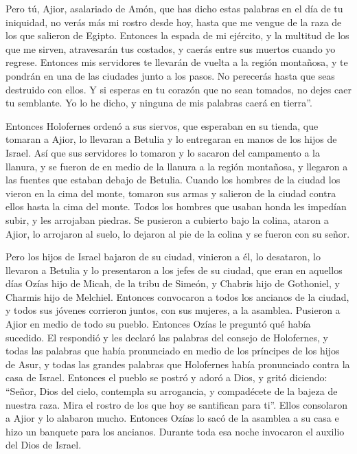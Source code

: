  Pero tú, Ajior, asalariado de Amón, que has dicho estas
palabras en el día de tu iniquidad, no verás más mi rostro desde hoy,
hasta que me vengue de la raza de los que salieron de Egipto.
 Entonces la espada de mi ejército, y la multitud de los
que me sirven, atravesarán tus costados, y caerás entre sus muertos
cuando yo regrese.  Entonces mis servidores te llevarán de
vuelta a la región montañosa, y te pondrán en una de las ciudades junto
a los pasos.  No perecerás hasta que seas destruido con
ellos.  Y si esperas en tu corazón que no sean tomados, no
dejes caer tu semblante. Yo lo he dicho, y ninguna de mis palabras caerá
en tierra''.

 Entonces Holofernes ordenó a sus siervos, que esperaban
en su tienda, que tomaran a Ajior, lo llevaran a Betulia y lo entregaran
en manos de los hijos de Israel.  Así que sus servidores
lo tomaron y lo sacaron del campamento a la llanura, y se fueron de en
medio de la llanura a la región montañosa, y llegaron a las fuentes que
estaban debajo de Betulia.  Cuando los hombres de la
ciudad los vieron en la cima del monte, tomaron sus armas y salieron de
la ciudad contra ellos hasta la cima del monte. Todos los hombres que
usaban honda les impedían subir, y les arrojaban piedras.
 Se pusieron a cubierto bajo la colina, ataron a Ajior,
lo arrojaron al suelo, lo dejaron al pie de la colina y se fueron con su
señor.

 Pero los hijos de Israel bajaron de su ciudad, vinieron
a él, lo desataron, lo llevaron a Betulia y lo presentaron a los jefes
de su ciudad,  que eran en aquellos días Ozías hijo de
Micah, de la tribu de Simeón, y Chabris hijo de Gothoniel, y Charmis
hijo de Melchiel.  Entonces convocaron a todos los
ancianos de la ciudad, y todos sus jóvenes corrieron juntos, con sus
mujeres, a la asamblea. Pusieron a Ajior en medio de todo su pueblo.
Entonces Ozías le preguntó qué había sucedido.  El
respondió y les declaró las palabras del consejo de Holofernes, y todas
las palabras que había pronunciado en medio de los príncipes de los
hijos de Asur, y todas las grandes palabras que Holofernes había
pronunciado contra la casa de Israel.  Entonces el pueblo
se postró y adoró a Dios, y gritó diciendo:  ``Señor,
Dios del cielo, contempla su arrogancia, y compadécete de la bajeza de
nuestra raza. Mira el rostro de los que hoy se santifican para ti''.
 Ellos consolaron a Ajior y lo alabaron mucho.
 Entonces Ozías lo sacó de la asamblea a su casa e hizo
un banquete para los ancianos. Durante toda esa noche invocaron el
auxilio del Dios de Israel.

